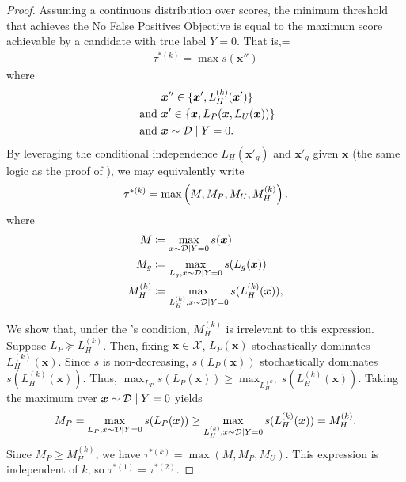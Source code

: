 \lemmaOne*
    \begin{proof}
        Assuming a continuous distribution over scores, the minimum threshold that achieves the No False Positives Objective is equal to the maximum score achievable by a candidate with true label \(Y = 0\). That is,=
        \begin{align*}
            \tau^{*(k)} = \max s(\bm{x}'')
        \end{align*}
        where
        \begin{align*}
            &\bm{x}'' \in \{\bm{x}', L_H^{(k)} (\bm{x}')\} 
        \\  \text{ and }
            &\bm{x}' \in \{\bm{x}, L_P(\bm{x}, L_U(\bm{x}))\}
        \\  \text{and }
            &\bm{x} \sim \mathcal{D} \mid Y = 0.
        \end{align*}
        By leveraging the conditional independence \(L_H(\bm{x}'_g)\) and \(\bm{x}'_g\) given \(\bm{x}\) (the same logic as the proof of ), we may equivalently write
        \begin{equation*}
            \tau^{*(k)} = \max\left( M, M_P, M_U, M_H^{(k)} \right).
        \end{equation*}
        where
        \begin{align*}
            M &\coloneqq \max_{x \sim \mathcal{D} \mid Y = 0} s(\bm{x}) \\
            M_g &\coloneqq \max_{L_g, x \sim \mathcal{D} \mid Y = 0} s(L_g(\bm{x})) \\
            M_H^{(k)} &\coloneqq \max_{L_H^{(k)}, x \sim \mathcal{D} \mid Y = 0} s(L_H^{(k)}(\bm{x})),
        \end{align*}
        
        We show that, under the 's condition, \(M_H^{(k)}\) is irrelevant to this expression. Suppose \(L_P \succeq L_H^{(k)}\). Then, fixing \(\bm{x} \in \mathcal{X}\), \(L_P(\bm{x})\) stochastically dominates \(L_H^{(k)}(\bm{x})\). Since \(s\) is non-decreasing, \(s(L_P(\bm{x}))\) stochastically dominates \(s(L_H^{(k)}(\bm{x}))\). Thus, \(\max_{L_P} s(L_P(\bm{x})) \geq \max_{L_H^{(k)}} s(L_H^{(k)}(\bm{x}))\). Taking the maximum over \(\bm{x} \sim \mathcal{D} \mid Y = 0\) yields
        \begin{equation*}
            M_P = \max_{L_P, x \sim \mathcal{D} \mid Y = 0} s(L_P(\bm{x})) 
            \geq
            \max_{L_H^{(k)}, x \sim \mathcal{D} \mid Y = 0} s(L_H^{(k)}(\bm{x})) = M_H^{(k)}.
        \end{equation*}
        Since \(M_P \geq M_H^{(k)}\), we have \(\tau^{*(k)} = \max(M, M_P, M_U)\). This expression is independent of \(k\), so \(\tau^{*(1)} = \tau^{*(2)}\).
        

\end{proof}
